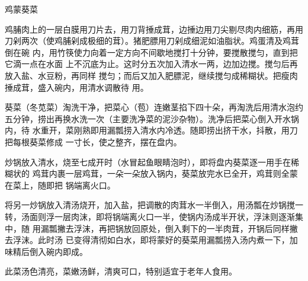 \begin{recipe}{鸡蒙葵菜}

\ingredients


\preparation

\step 鸡脯肉上的一层白膜用刀片去，用刀背捶成茸，边捶边用刀尖剔尽肉内细筋，再用
刀剁两次（使鸡脯剁成极细的茸）。猪肥膘用刀剁成细泥如油脂状。鸡蛋清及鸡茸倒在碗
内，用竹筷使力向着一定方向不间歇地搅打十分钟，要搅散搅匀，直到把它滴一点在水面
上不沉底为止。这时分五次加入清水一两，边加边搅。搅匀后再放入盐、水豆粉，再同样
搅匀；而后又加入肥膘泥，继续搅匀成稀糊状。把瘦肉捶成茸，盛入碗内，用清水调散待
用。

\step 葵菜（冬苋菜）淘洗干净，把菜心（苞）连嫩茎掐下四十朵，再淘洗后用清水泡约
五分钟，捞出再换水洗一次（主要洗净菜的泥沙杂物）。洗净后把菜心倒入开水锅内，待
水重开，菜刚熟即用漏瓢捞入清水内冷透。随即捞出挤干水，抖散，用刀把每根葵菜修成
一寸长，使之整齐，摆在盘内。

炒锅放入清水，烧至七成开时（水冒起鱼眼睛泡时），即将盘内葵菜逐一用手在稀糊状的
鸡茸内裹一层鸡茸，一朵一朵放入锅内，葵菜放完水已全开，鸡茸则全蒙在菜上，随即把
锅端离火口。

\step 将另一炒锅放入清汤烧开，加入盐，把调散的肉茸水一半倒入，用汤瓢在炒锅搅一
转，汤面则浮一层肉沫，即将锅端离火口一半，使锅内汤成半开状，浮沬则逐渐集中，随
用漏瓢撇去浮沫，再把锅放回原处，倒入剩下的一半肉茸，开锅后同样撇去浮沫。此时汤
已变得清彻如白水，即将蒙好的葵菜用漏瓢捞入汤内煮一下，加味精后倒入碗内即成。

\features

此菜汤色清亮，菜嫩汤鲜，清爽可口，特别适宜于老年人食用。

\end{recipe}

